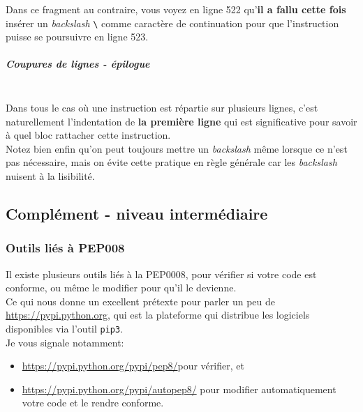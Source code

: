    Dans ce fragment au contraire, vous voyez en ligne 522 qu'\textbf{il a
fallu cette fois} insérer un \emph{backslash} \texttt{\textbackslash{}}
comme caractère de continuation pour que l'instruction puisse se
poursuivre en ligne 523.

    \hypertarget{coupures-de-lignes---uxe9pilogue}{%
\subparagraph{Coupures de lignes -
épilogue\\\\}\label{coupures-de-lignes---uxe9pilogue}}

    Dans tous le cas où une instruction est répartie sur plusieurs lignes,
c'est naturellement l'indentation de \textbf{la première ligne} qui est
significative pour savoir à quel bloc rattacher cette instruction.\\

    Notez bien enfin qu'on peut toujours mettre un \emph{backslash} même
lorsque ce n'est pas nécessaire, mais on évite cette pratique en règle
générale car les \emph{backslash} nuisent à la lisibilité.

    \hypertarget{compluxe9ment---niveau-intermuxe9diaire}{%
\subsection{Complément - niveau
intermédiaire}\label{compluxe9ment---niveau-intermuxe9diaire}}

    \hypertarget{outils-liuxe9s-uxe0-pep008}{%
\subsubsection{Outils liés à PEP008}\label{outils-liuxe9s-uxe0-pep008}}

Il existe plusieurs outils liés à la PEP0008, pour vérifier si votre
code est conforme, ou même le modifier pour qu'il le devienne.\\

Ce qui nous donne un excellent prétexte pour parler un peu de
\href{https://pypi.python.org}{https://pypi.python.org}, qui est la plateforme qui distribue les
logiciels disponibles via l'outil \texttt{pip3}.\\

Je vous signale notamment:

\begin{itemize}
\tightlist
\item
  \href{https://pypi.python.org/pypi/pep8/}{https://pypi.python.org/pypi/pep8/}pour vérifier, et
\item
  \href{https://pypi.python.org/pypi/autopep8/}{https://pypi.python.org/pypi/autopep8/} pour modifier automatiquement
  votre code et le rendre conforme.
\end{itemize}

